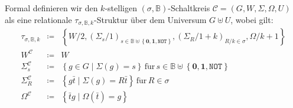 \begin{defn}
\label{def:formal}Formal definieren wir den $k$-stelligen $\left(\sigma,\mathbb{B}\right)$-Schaltkreis
$\mathcal{C}=\left(G,W,\Sigma,\Omega,U\right)$ als eine relationale
$\tau_{\sigma,\mathbb{B},k}$-Struktur über dem Universum $G\uplus U$,
wobei gilt:
\begin{eqnarray*}
\tau_{\sigma,\mathbb{B},k} & \coloneqq & \left\{ W/2,\left(\Sigma_{s}/1\right)_{s\in\mathbb{B}\uplus\left\{ \mathbf{0},\mathbf{1},\mathtt{NOT}\right\} },\left(\Sigma_{R}/1+k\right)_{R/k\in\sigma},\Omega/k+1\right\} \\
W^{\mathcal{C}} & \coloneqq & W\\
\Sigma_{s}^{\mathcal{C}} & \coloneqq & \left\{ g\in G\mid\Sigma\left(g\right)=s\right\} \,\mathrm{f\ddot{u}r}\,s\in\mathbb{B}\uplus\left\{ \mathbf{0},\mathbf{1},\mathtt{NOT}\right\} \\
\Sigma_{R}^{\mathcal{C}} & \coloneqq & \left\{ g\bar{t}\mid\Sigma\left(g\right)=R\bar{t}\right\} \,\mathrm{f\ddot{u}r}\,R\in\sigma\\
\Omega^{\mathcal{C}} & \coloneqq & \left\{ \bar{t}g\mid\Omega\left(\bar{t}\right)=g\right\} 
\end{eqnarray*}
\end{defn}

